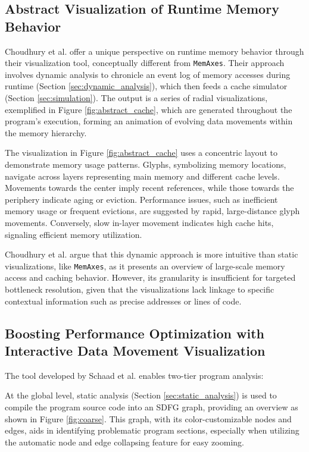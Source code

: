 \subsection{Abstract Visualization of Runtime Memory Behavior}\label{sec:abstract}
Choudhury et al. \cite{choudhury2011abstract} offer a unique perspective on runtime memory behavior through their visualization tool, conceptually different from \texttt{MemAxes}. Their approach involves dynamic analysis to chronicle an event log of memory accesses during runtime (Section \ref{sec:dynamic_analysis}), which then feeds a cache simulator (Section \ref{sec:simulation}). The output is a series of radial visualizations, exemplified in Figure \ref{fig:abstract_cache}, which are generated throughout the program's execution, forming an animation of evolving data movements within the memory hierarchy.

The visualization in Figure \ref{fig:abstract_cache} uses a concentric layout to demonstrate memory usage patterns. Glyphs, symbolizing memory locations, navigate across layers representing main memory and different cache levels. Movements towards the center imply recent references, while those towards the periphery indicate aging or eviction. Performance issues, such as inefficient memory usage or frequent evictions, are suggested by rapid, large-distance glyph movements. Conversely, slow in-layer movement indicates high cache hits, signaling efficient memory utilization.

Choudhury et al. argue that this dynamic approach is more intuitive than static visualizations, like \texttt{MemAxes}, as it presents an overview of large-scale memory access and caching behavior. However, its granularity is insufficient for targeted bottleneck resolution, given that the visualizations lack linkage to specific contextual information such as precise addresses or lines of code.

\subsection{Boosting Performance Optimization with Interactive Data Movement Visualization}\label{sec:boosting}
The tool developed by Schaad et al. \cite{schaad2021boosting,schaad2022boosting} enables two-tier program analysis:

At the global level, static analysis (Section \ref{sec:static_analysis}) is used to compile the program source code into an SDFG graph, providing an overview as shown in Figure \ref{fig:coarse}. This graph, with its color-customizable nodes and edges, aids in identifying problematic program sections, especially when utilizing the automatic node and edge collapsing feature for easy zooming.

